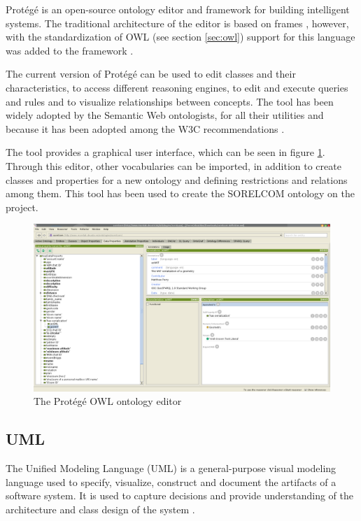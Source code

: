Prot\'eg\'e is an open-source ontology editor and framework for building intelligent systems\cite{protege1}. The traditional architecture of the editor is based on frames \cite{protege2}, however, with the standardization of OWL (see section \ref{sec:owl}) support for this language was added to the framework \cite{protege3}.

The current version of Prot\'eg\'e can be used to edit classes and their characteristics, to access different reasoning engines, to edit and execute queries and rules and to visualize relationships between concepts. The tool has been widely adopted by the Semantic Web ontologists, for all their utilities and because it has been adopted among the W3C recommendations \cite{protege4}.

The tool provides a graphical user interface, which can be seen in figure \ref{fig:protege}. Through this editor, other vocabularies can be imported, in addition to create classes and properties for a new ontology and defining restrictions and relations among them. This tool has been used to create the SORELCOM ontology on the project.

\begin{figure}[ht]
  \centering
  \includegraphics[width=.8\textwidth]{fig/protege}
  \caption{The Prot\'eg\'e OWL ontology editor}
  \label{fig:protege}
\end{figure} 

\subsection{UML}

The Unified Modeling Language (UML) is a general-purpose visual modeling language used to specify, visualize, construct and document the artifacts of a software system. It is used to capture decisions and provide understanding of the architecture and class design of the system \cite{uml}. 

